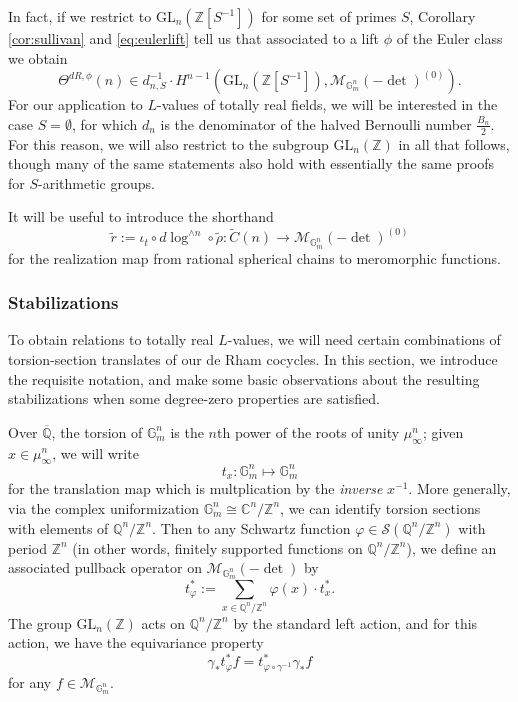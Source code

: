 \documentclass[10pt]{amsart}
\theoremstyle{definition}
\newcommand{\Z}{\mathbb{Z}}
\newcommand{\Q}{\mathbb{Q}}
\newcommand{\C}{\mathbb{C}}
\newcommand{\cS}{\mathcal{S}}
\newcommand{\G}{\mathbb{G}}
\newcommand{\GL}{\mathrm{GL}}
\numberwithin{equation}{section}
\begin{document}
    In fact, if we restrict to $\GL_n(\Z[S^{-1}])$ for some set of primes $S$, Corollary \ref{cor:sullivan} and \eqref{eq:eulerlift} tell us that associated to a lift $\phi$ of the Euler class we obtain
    \[
    \Theta^{dR,\phi}(n) \in d_{n,S}^{-1} \cdot H^{n-1}(\GL_n(\Z[S^{-1}]), \mathcal{M}_{\G_m^n}(-\det)^{(0)}). 
    \]
    For our application to $L$-values of totally real fields, we will be interested in the case $S=\emptyset$, for which $d_n$ is the denominator of the halved Bernoulli number $\frac{B_n}{2}$. For this reason, we will also restrict to the subgroup $\GL_n(\Z)$ in all that follows, though many of the same statements also hold with essentially the same proofs for $S$-arithmetic groups. 

    It will be useful to introduce the shorthand
    \[
    \tilde{r}:=\iota_t\circ d\log^{\wedge n}\circ \tilde{\rho}:\tilde{C}(n) \to \mathcal{M}_{\G_m^n}(-\det)^{(0)}
    \]
    for the realization map from rational spherical chains to meromorphic functions.

    \subsubsection{Stabilizations}

    To obtain relations to totally real $L$-values, we will need certain combinations of torsion-section translates of our de Rham cocycles. In this section, we introduce the requisite notation, and make some basic observations about the resulting stabilizations when some degree-zero properties are satisfied.

    Over $\overline{\Q}$, the torsion of $\G_m^n$ is the $n$th power of the roots of unity $\mu_\infty^n$; given $x\in \mu_\infty^n$, we will write 
    \[
    t_x: \G_m^n\mapsto \G_m^n
    \]
    for the translation map which is multplication by the \emph{inverse} $x^{-1}$. More generally, via the complex uniformization $\G_m^n \cong \C^n/\Z^n$, we can identify torsion sections with elements of $\Q^n/\Z^n$. Then to any Schwartz function $\varphi \in \cS(\Q^n/\Z^n)$ with period $\Z^n$ (in other words, finitely supported functions on $\Q^n/\Z^n$), we define an associated pullback operator on $\mathcal{M}_{\G_m^n}(-\det)$ by 
    \[
    t_{\varphi}^* := \sum_{x\in \Q^n/\Z^n} \varphi(x) \cdot t_x^*.
    \]
    The group $\GL_n(\Z)$ acts on $\Q^n/\Z^n$ by the standard left action, and for this action, we have the equivariance property
    \[
    \gamma_* t^*_\varphi  f = t^*_{\varphi \circ \gamma^{-1}} \gamma_* f
    \]
    for any $f\in \mathcal{M}_{\G_m^n}$.
    
\end{document}
